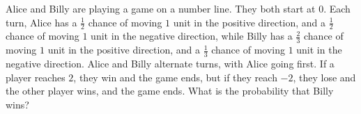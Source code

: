Alice and Billy are playing a game on a number line. They both start at $0$. Each turn, Alice has a $\frac{1}{2}$ chance of moving $1$ unit in the positive direction, and a $\frac{1}{2}$ chance of moving $1$ unit in the negative direction, while Billy has a $\frac{2}{3}$ chance of moving $1$ unit in the positive direction, and a $\frac{1}{3}$ chance of moving $1$ unit in the negative direction. Alice and Billy alternate turns, with Alice going first. If a player reaches $2$, they win and the game ends, but if they reach $-2$, they lose and the other player wins, and the game ends. What is the probability that Billy wins?